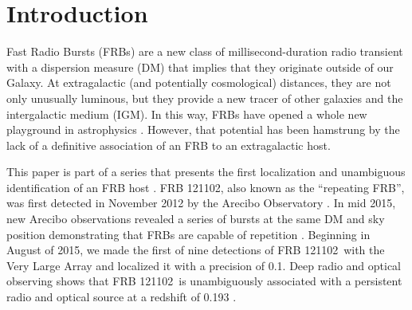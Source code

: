 \documentclass[twocolumn]{aastex61}
\newcommand{\frb}{FRB 121102}
\begin{document}

\author{R.~S.~Wharton}


\begin{abstract}
The millisecond radio transients known as Fast Radio Bursts have recently emerged as a mysterious, new class of astrophysical transient. The discovery of repeating bursts from \frb\ has shown that at least some FRBs are not cataclysmic and opened potential for studying FRB properties via a homogenous sample of bursts. The recent localization of \frb\ with the Very Large Array has helped measure its distance and a host of intrinsic properties. This localization was made with 9 bursts seen by the VLA in coordination the Arecibo, Effelsberg, and AMI-LA observatories. We present a detailed analysis of these bursts, including the first simultaneous detection of an FRB with multiple telescopes. We show that the burst spectra typically have a broad Gaussian shape on the scale of $\sim500$~MHz with fine spectral structure consistent with either scintillation or unresolved temporal structure. We present the luminosity distribution and temporal statistics for \frb\ and argue that the whole FRB population is adequately described by a single class similar to \frb. We close with thoughts on optimal strategies to make new interferometric localizations of FRBs.
\end{abstract}

\section{Introduction}
Fast Radio Bursts (FRBs) are a new class of millisecond-duration radio transient with a dispersion measure (DM) that implies that they originate outside of our Galaxy. At extragalactic (and potentially cosmological) distances, they are not only unusually luminous, but they provide a new tracer of other galaxies and the intergalactic medium (IGM). In this way, FRBs have opened a whole new playground in astrophysics \citep[e.g.,][]{2014A&A...562A.137F, 2014ApJ...780L..33M, 2016MNRAS.457..232C}. However, that potential has been hamstrung by the lack of a definitive association of an FRB to an extragalactic host.

This paper is part of a series that presents the first localization and unambiguous identification of an FRB host \citep{LOC, OPT, EVN}. \frb, also known as the ``repeating FRB'', was first detected in November 2012 by the Arecibo Observatory \citep{2014ApJ...790..101S}. In mid 2015, new Arecibo observations revealed a series of bursts at the same DM and sky position demonstrating that FRBs are capable of repetition \citep{2016Natur.531..202S}. Beginning in August of 2015, we made the first of nine detections of \frb\ with the Very Large Array \citep{LOC} and localized it with a precision of 0.1\arcsec. Deep radio and optical observing shows that \frb\ is unambiguously associated with a persistent radio and optical source at a redshift of 0.193 \citep{OPT, EVN}.
\end{document}
